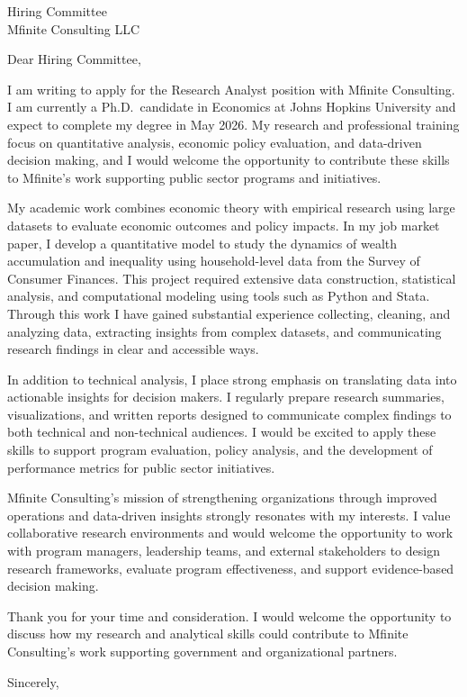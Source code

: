 \documentclass[11pt]{letter}
\begin{document}
\begin{letter}{Hiring Committee \\
Mfinite Consulting LLC}

\opening{Dear Hiring Committee,}

I am writing to apply for the Research Analyst position with Mfinite Consulting. I am currently a Ph.D.\ candidate in Economics at Johns Hopkins University and expect to complete my degree in May 2026. My research and professional training focus on quantitative analysis, economic policy evaluation, and data-driven decision making, and I would welcome the opportunity to contribute these skills to Mfinite’s work supporting public sector programs and initiatives.

My academic work combines economic theory with empirical research using large datasets to evaluate economic outcomes and policy impacts. In my job market paper, I develop a quantitative model to study the dynamics of wealth accumulation and inequality using household-level data from the Survey of Consumer Finances. This project required extensive data construction, statistical analysis, and computational modeling using tools such as Python and Stata. Through this work I have gained substantial experience collecting, cleaning, and analyzing data, extracting insights from complex datasets, and communicating research findings in clear and accessible ways.

In addition to technical analysis, I place strong emphasis on translating data into actionable insights for decision makers. I regularly prepare research summaries, visualizations, and written reports designed to communicate complex findings to both technical and non-technical audiences. I would be excited to apply these skills to support program evaluation, policy analysis, and the development of performance metrics for public sector initiatives.

Mfinite Consulting’s mission of strengthening organizations through improved operations and data-driven insights strongly resonates with my interests. I value collaborative research environments and would welcome the opportunity to work with program managers, leadership teams, and external stakeholders to design research frameworks, evaluate program effectiveness, and support evidence-based decision making.

Thank you for your time and consideration. I would welcome the opportunity to discuss how my research and analytical skills could contribute to Mfinite Consulting’s work supporting government and organizational partners.

\closing{Sincerely,}

\end{letter}
\end{document}
